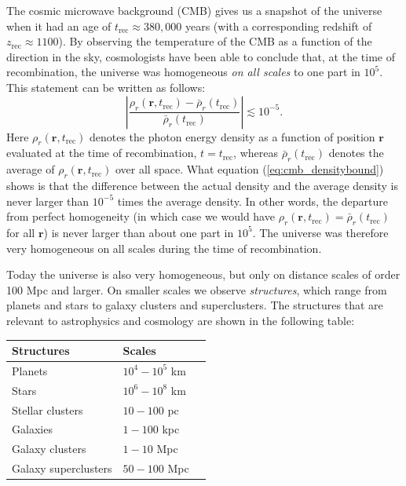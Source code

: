 The cosmic microwave background (CMB) gives us a snapshot of the universe when it had an age of $t_{\mathrm{rec}}\approx 380,000$ years (with a corresponding redshift of $z_{\mathrm{rec}}\approx1100$). By observing the temperature of the CMB as a function of the direction in the sky, cosmologists have been able to conclude that, at the time of recombination, the universe was homogeneous {\it on all scales} to one part in $10^5$. This statement can be written as follows:
\begin{equation} \label{eq:cmb_densitybound}
\left| \frac{\rho_r(\mathbf{r},t_{\mathrm{rec}})-\bar{\rho}_r(t_{\mathrm{rec}})}{\bar{\rho}_r(t_{\mathrm{rec}})} \right| \lesssim 10^{-5}.
\end{equation}
Here $\rho_r(\mathbf{r},t_{\mathrm{rec}})$ denotes the photon energy density as a function of position $\mathbf{r}$ evaluated at the time of recombination, $t=t_{\mathrm{rec}}$, whereas $\bar{\rho}_r(t_{\mathrm{rec}})$ denotes the average of $\rho_r(\mathbf{r},t_{\mathrm{rec}})$ over all space. What equation (\ref{eq:cmb_densitybound}) shows is that the difference between the actual density and the average density is never larger than $10^{-5}$ times the average density. In other words, the departure from perfect homogeneity (in which case we would have $\rho_r(\mathbf{r},t_{\mathrm{rec}})=\bar{\rho}_r(t_{\mathrm{rec}})$ for all $\mathbf{r}$) is never larger than about one part in $10^5$. The universe was therefore very homogeneous on all scales during the time of recombination.

Today the universe is also very homogeneous, but only on distance scales of order 100 Mpc and larger. On smaller scales we observe {\it structures}, which range from planets and stars to galaxy clusters and superclusters. The structures that are relevant to astrophysics and cosmology are shown in the following table:
\begin{table}[ht]
\begin{center}
\begin{tabular}{p{5cm} l l} \hline\hline
Structures & Scales  \\ \hline
Planets & $10^4-10^5$ km \\
Stars & $10^6-10^8$ km \\
Stellar clusters & $10-100$ pc \\
Galaxies & $1-100$ kpc \\
Galaxy clusters & $1-10$ Mpc \\
Galaxy superclusters & $50-100$ Mpc \\ \hline\hline
\end{tabular}
\end{center}
\end{table}


